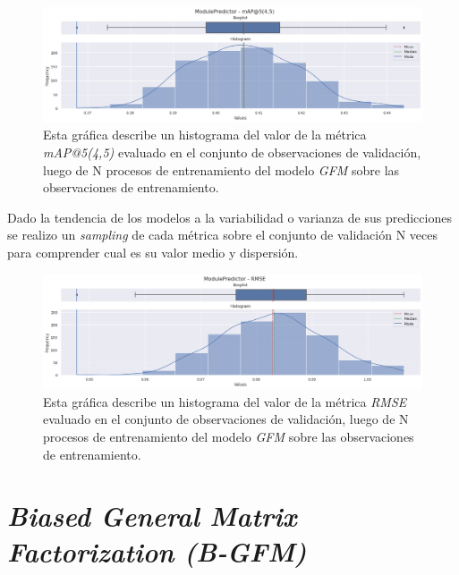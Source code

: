 \documentclass[11pt,a4paper,twoside]{thesis}
\begin{document}
\clearpage

\begin{figure}[h!]
	\centering
	\includegraphics[width=15cm]{./images/metrics-GFM-mapk.png}
	\caption{Esta gráfica describe un histograma del valor de la métrica \textit{mAP@5(4,5)} evaluado en el conjunto de observaciones de validación, luego de N procesos de entrenamiento del modelo \textit{GFM} sobre las observaciones de entrenamiento.}
\end{figure}

Dado la tendencia de los modelos a la variabilidad o varianza de sus
predicciones se realizo un \textit{sampling} de cada métrica sobre el conjunto
de validación N veces para comprender cual es su valor medio y dispersión.

\begin{figure}[h!]
	\centering
	\includegraphics[width=15cm]{./images/metrics-GFM-RMSE.png}
	\caption{Esta gráfica describe un histograma del valor de la métrica \textit{RMSE} evaluado en el conjunto de observaciones de validación, luego de N procesos de entrenamiento del modelo \textit{GFM} sobre las observaciones de entrenamiento.}
\end{figure}

\clearpage
\section{\textit{Biased General Matrix Factorization (B-GFM)}}
\end{document}
